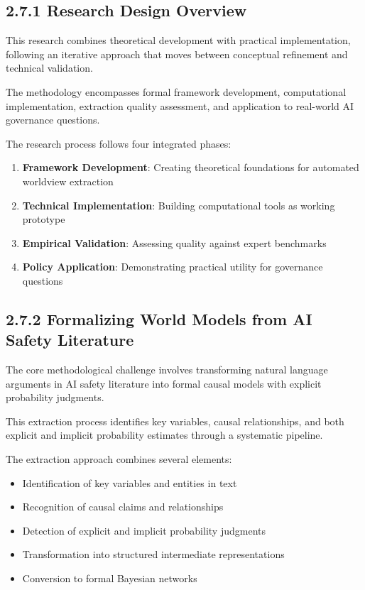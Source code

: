 \documentclass[
  11pt,
  letterpaper,
]{book}
\providecommand{\tightlist}{%
  \setlength{\itemsep}{0pt}\setlength{\parskip}{0pt}}
\begin{document}

\subsection*{2.7.1 Research Design Overview}\label{sec-research-design}

This research combines theoretical development with practical
implementation, following an iterative approach that moves between
conceptual refinement and technical validation.

The methodology encompasses formal framework development, computational
implementation, extraction quality assessment, and application to
real-world AI governance questions.

The research process follows four integrated phases:

\begin{enumerate}
\def\labelenumi{\arabic{enumi}.}
\tightlist
\item
  \textbf{Framework Development}: Creating theoretical foundations for
  automated worldview extraction
\item
  \textbf{Technical Implementation}: Building computational tools as
  working prototype
\item
  \textbf{Empirical Validation}: Assessing quality against expert
  benchmarks
\item
  \textbf{Policy Application}: Demonstrating practical utility for
  governance questions
\end{enumerate}

\subsection*{2.7.2 Formalizing World Models from AI Safety
Literature}\label{sec-formalizing-world-models}

The core methodological challenge involves transforming natural language
arguments in AI safety literature into formal causal models with
explicit probability judgments.

This extraction process identifies key variables, causal relationships,
and both explicit and implicit probability estimates through a
systematic pipeline.

The extraction approach combines several elements:

\begin{itemize}
\tightlist
\item
  Identification of key variables and entities in text
\item
  Recognition of causal claims and relationships
\item
  Detection of explicit and implicit probability judgments
\item
  Transformation into structured intermediate representations
\item
  Conversion to formal Bayesian networks
\end{itemize}
\end{document}
